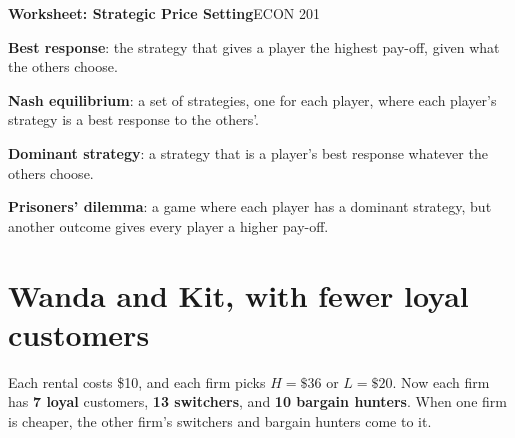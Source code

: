 \documentclass[11pt]{article}
\begin{document}
{\LARGE\bfseries\color{accent} Worksheet: Strategic Price Setting}\hfill{\large ECON 201}

\newcommand{\term}[1]{\textcolor{accentdark}{\textbf{#1}}}

\newenvironment{deflist}
  {\begin{list}{\textbullet}{%
     \setlength{\leftmargin}{1.1em}\setlength{\labelwidth}{0.7em}%
     \setlength{\labelsep}{0.4em}\setlength{\itemindent}{0pt}%
     \setlength{\listparindent}{0pt}\setlength{\topsep}{2pt}%
     \setlength{\partopsep}{0pt}\setlength{\parsep}{0pt}%
     \setlength{\itemsep}{2pt}}}
  {\end{list}}

\begin{tcolorbox}[colback=cream, colframe=accent, boxrule=0.6pt, arc=2pt,
  left=6pt, right=6pt, top=4pt, bottom=4pt, title=Definitions,
  fonttitle=\bfseries, coltitle=white]
\begin{deflist}
\item \term{Best response}: the strategy that gives a player the highest
  pay-off, given what the others choose.
\item \term{Nash equilibrium}: a set of strategies, one for each player,
  where each player's strategy is a best response to the others'.
\item \term{Dominant strategy}: a strategy that is a player's best response
  whatever the others choose.
\item \term{Prisoners' dilemma}: a game where each player has a dominant
  strategy, but another outcome gives every player a higher pay-off.
\end{deflist}
\end{tcolorbox}

\section{Wanda and Kit, with fewer loyal customers}

Each rental costs \$10, and each firm picks $H = \$36$ or $L = \$20$. Now each firm has \textbf{7 loyal} customers, \textbf{13 switchers}, and \textbf{10 bargain hunters}. When one firm is cheaper, the other firm's switchers and bargain hunters come to it.
\end{document}
